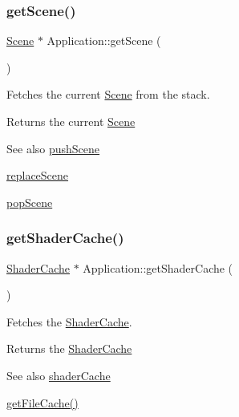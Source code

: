 \subsubsection{\texorpdfstring{getScene()}{getScene()}}
{\footnotesize\ttfamily \mbox{\hyperlink{classsage_1_1Scene}{Scene}} $\ast$ Application\+::get\+Scene (\begin{DoxyParamCaption}{ }\end{DoxyParamCaption})}



Fetches the current \mbox{\hyperlink{classsage_1_1Scene}{Scene}} from the stack. 

\begin{DoxyReturn}{Returns}
the current \mbox{\hyperlink{classsage_1_1Scene}{Scene}} 
\end{DoxyReturn}
\begin{DoxySeeAlso}{See also}
\mbox{\hyperlink{classsage_1_1Application_ad69ba03dafa5afd69f2d6eb2a9d5fad5}{push\+Scene}} 

\mbox{\hyperlink{classsage_1_1Application_a49f5ce7574cf4f3053c4213d3177c76c}{replace\+Scene}} 

\mbox{\hyperlink{classsage_1_1Application_a47b5bec61b3d93cbb4998b42d0d2ea47}{pop\+Scene}} 
\end{DoxySeeAlso}
\mbox{\label{classsage_1_1Application_aa9260bf22da6d4fc5451c789c17ad7a5}} 
\subsubsection{\texorpdfstring{getShaderCache()}{getShaderCache()}}
{\footnotesize\ttfamily \mbox{\hyperlink{classsage_1_1ShaderCache}{Shader\+Cache}} $\ast$ Application\+::get\+Shader\+Cache (\begin{DoxyParamCaption}{ }\end{DoxyParamCaption})}



Fetches the \mbox{\hyperlink{classsage_1_1ShaderCache}{Shader\+Cache}}. 

\begin{DoxyReturn}{Returns}
the \mbox{\hyperlink{classsage_1_1ShaderCache}{Shader\+Cache}} 
\end{DoxyReturn}
\begin{DoxySeeAlso}{See also}
\mbox{\hyperlink{classsage_1_1Application_adc39fae2de148d3c726b86d0c93a4816}{shader\+Cache}} 

\mbox{\hyperlink{classsage_1_1Application_a782edaec320c507870814d8576f84fba}{get\+File\+Cache()}} 
\end{DoxySeeAlso}
\mbox{\label{classsage_1_1Application_a20be3d592c9d2662051796420d0cd1d8}} 
